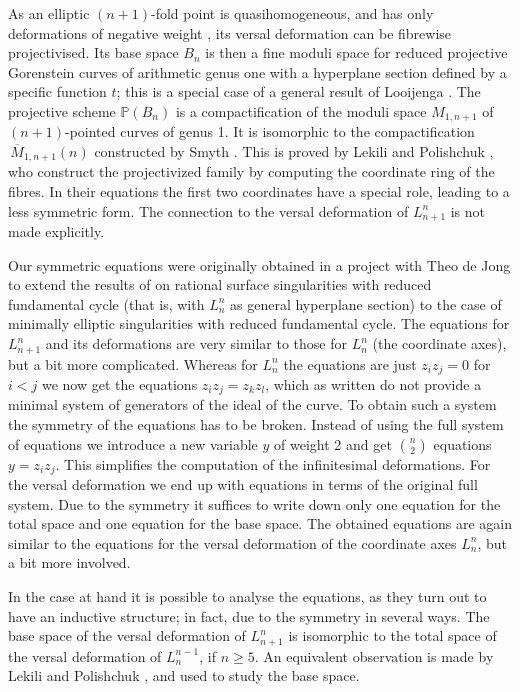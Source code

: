 \documentclass[12pt,a4paper]{amsart}  %
\renewcommand{\P}{\mathbb{P}}
\newcommand{\olsi}[1]{\,\overline{\!{#1}}}
\theoremstyle{definition}
\theoremstyle{remark}
\begin{document}
As an elliptic $(n+1)$-fold point is quasihomogeneous, and has only deformations of negative
weight \cite{Pi}, its versal deformation can be fibrewise projectivised. Its base space $B_n$ is then
a fine moduli space for reduced projective  Gorenstein curves of arithmetic genus one
with a hyperplane section defined by a specific function $t$; this is a special case
of a general result of Looijenga \cite{Lo}. The projective scheme $\P(B_n)$ is a 
compactification  of the moduli space $M_{1,n+1}$ of $(n+1)$-pointed
curves of genus 1. It is isomorphic to the compactification 
$\olsi{M}_{1,n+1}(n)$ constructed by Smyth \cite{Sm}. This is proved by 
Lekili and Polishchuk \cite{LP}, who construct the projectivized family by computing the
coordinate ring of the fibres. In their equations the first two coordinates have a special role,
leading to a less symmetric form.
The connection to the versal deformation of $L_{n+1}^n$ is not made explicitly.

Our symmetric equations were originally obtained in a project with Theo de Jong to extend
the results of \cite{dJvS} on rational surface singularities with reduced fundamental cycle
(that is, with $L_n^n$ as general hyperplane section) to the case of minimally elliptic
singularities with reduced fundamental cycle.
The equations for $L_{n+1}^n$ and its deformations are very similar to those
for $L^n_n$ (the coordinate axes), but a bit more complicated. Whereas
for $L^n_n$ the equations are just $z_iz_j=0$ for $i<j$ we now get the equations
$z_iz_j=z_kz_l$, which as written do not provide a minimal system of generators of the ideal
of the curve. To obtain such a system the symmetry of the equations has to be broken.
Instead of using the full system of equations we introduce a new variable $y$
of  weight 2 and get $\binom n2$ equations $y=z_iz_j$. 
This simplifies the computation of the infinitesimal deformations.
For the versal deformation we end up with equations in terms of the original
full system. Due to the symmetry it suffices
to write down only one equation for the total space and one equation
for the base space.
The obtained equations are again similar to the equations for the versal deformation of the
coordinate axes $L_n^n$, but  a bit more involved. 

In the case at hand it is possible to analyse the equations, as they turn out to have
an inductive structure; in fact, due to the symmetry in several ways.
The base space 
of the versal deformation of $L_{n+1}^n$ is isomorphic to the
total space of the versal deformation of $L_{n}^{n-1}$, if $n\geq 5$. An equivalent
observation is made by Lekili and Polishchuk \cite{LP}, and used to study the base space.
\end{document}
